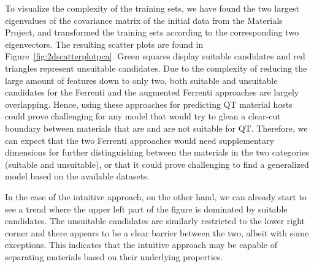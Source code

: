 \documentclass[superscriptaddress,unsortedaddress,
 amsmath,amssymb,
 aps,
]{revtex4-2}
\begin{document}
To visualize the complexity of the training sets, we have found the two largest eigenvalues of the covariance matrix of the initial data from the Materials Project, and transformed the training sets according to the corresponding two eigenvectors. The resulting scatter plots are found in Figure~\ref{fig:2dscatterplotpca}. 
Green squares display suitable candidates and red triangles represent unsuitable candidates. 
Due to the complexity of reducing the large amount of features down to only two, both suitable and unsuitable candidates for the Ferrenti and the augmented Ferrenti approaches are largely overlapping. 
Hence, using these approaches for predicting QT material hosts could prove challenging for any model that would try to glean a clear-cut boundary between materials that are and are not suitable for QT. 
Therefore, we can expect that the two Ferrenti approaches would need supplementary dimensions for further distinguishing between the materials in the two categories (suitable and unsuitable), or that it could prove challenging to find a generalized model based on the available datasets.  

In the case of the intuitive approach, on the other hand, we can already start to see a trend where the upper left part of the figure is dominated by suitable candidates. The unsuitable candidates are similarly restricted to the lower right corner and there appears to be a clear barrier between the two, albeit with some exceptions. This indicates that the intuitive approach may be capable of separating materials based on their underlying properties.  
\end{document}
